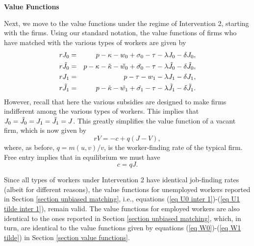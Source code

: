 \documentclass[12pt]{article} %
\theoremstyle{definition}
\begin{document}
\bigskip 

\noindent \textbf{Value Functions}

\noindent Next, we move to the value functions under the regime of Intervention 2, starting with the firms. Using our standard notation, the value functions of firms who have matched with the various types of workers are given by
\begin{eqnarray}
    rJ_0 &=&p-\kappa - w_0 + \sigma_0 - \tau -\lambda J_0 - \delta J_0,\label{eq J0 inter 2} \\
    r\Tilde{J_0} &=& p-\kappa-\Tilde{\kappa}-\Tilde{w_0}+ \Tilde{\sigma_0} - \tau - \lambda \Tilde{J_0} - \delta \Tilde{J_0},\label{eq J0 tilde inter 2}\\
    rJ_1 &=&p-\tau-w_1-\lambda J_1 - \delta J_1, \label{eq J1 inter 2} \\
    r\Tilde{J_1} &=&p-\Tilde{\kappa}-\Tilde{w_1}+ \Tilde{\sigma_1} - \tau-\lambda \Tilde{J_1} - \delta \Tilde{J_1}. \label{eq J1 tilde inter 2}
    \end{eqnarray}
However, recall that here the various subsidies are designed to make firms indifferent among the various types of workers. This implies that $J_0=\Tilde{J_0}=J_1=\Tilde{J_1}=J$. This greatly simplifies the value function of a vacant firm, which is now given by 
\begin{equation}
   rV = -c + q (J-V), \nonumber 
\end{equation}where, as before, $q=m(u,v)/v$, is the worker-finding rate of the typical firm. Free entry implies that in equilibrium we must have  
\begin{equation}
 c = q J.\label{eq free entry intervention 2} 
\end{equation}

Since all types of workers under Intervention 2 have identical job-finding rates (albeit for different reasons), the value functions for unemployed workers reported in Section \ref{section unbiased matching}, i.e., equations (\ref{eq U0 inter 1})-(\ref{eq U1 tilde inter 1}), remain valid. 
The value functions for employed workers are also identical to the ones reported in Section \ref{section unbiased matching}, which, in turn, are identical to the value functions given by equations (\ref{eq W0})-(\ref{eq W1 tilde}) in Section \ref{section value functions}. 
\end{document}
